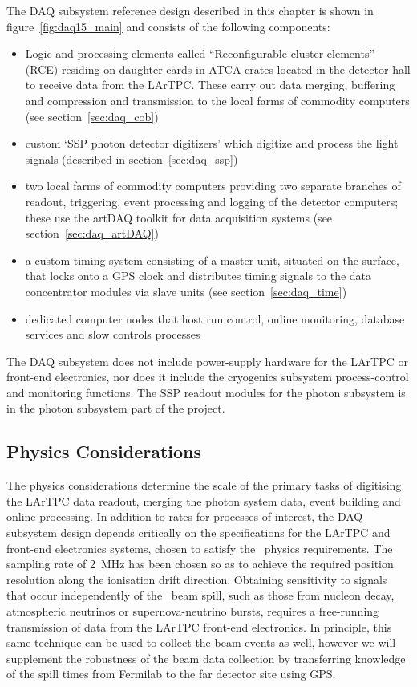 The DAQ subsystem reference design described in this chapter is shown
in figure~\ref{fig:daq15_main} and consists of the following
components:
\begin{itemize}
  \item Logic and processing elements called ``Reconfigurable cluster
    elements'' (RCE) residing on daughter cards in ATCA crates located
    in the detector hall to receive data from the LArTPC.  These carry
    out data merging, buffering and compression and transmission to the
    local farms of commodity computers (see section~\ref{sec:daq_cob})
  \item custom `SSP photon detector digitizers' which digitize and
    process the light signals (described in section~\ref{sec:daq_ssp}) 
  \item two local farms of commodity computers providing two separate
    branches of readout, triggering, event processing and logging of the
    detector computers; these use the artDAQ toolkit for data
    acquisition systems (see section~\ref{sec:daq_artDAQ})
  \item a custom timing system consisting of a master unit, situated
    on the surface, that locks onto a GPS clock and distributes timing
    signals to the data concentrator modules via slave units (see
    section~\ref{sec:daq_time})
  \item dedicated computer nodes that host run control, online
    monitoring, database services and slow controls processes
\end{itemize}
%
The DAQ subsystem does not include power-supply hardware for the
LArTPC or front-end electronics, nor does it include the cryogenics
subsystem process-control and monitoring functions.  The SSP readout
modules for the photon subsystem is in the photon subsystem part of
the project.

\subsection{Physics Considerations}
\label{sec:daq_phys}

The physics considerations determine the scale of the primary tasks of
digitising the LArTPC data readout, merging the photon system data,
event building and online processing.  In addition to rates for
processes of interest, the DAQ subsystem design depends critically on
the specifications for the LArTPC and front-end electronics systems,
chosen to satisfy the \LBNE\ physics requirements.  The sampling rate
of 2~MHz has been chosen so as to achieve the required position
resolution along the ionisation drift direction. Obtaining sensitivity
to signals that occur independently of the \LBNE\ beam spill, such as
those from nucleon decay, atmospheric neutrinos or supernova-neutrino
bursts, requires a free-running transmission of data from the LArTPC
front-end electronics.  In principle, this same technique can be used
to collect the beam events as well, however we will supplement the
robustness of the beam data collection by transferring knowledge of
the spill times from Fermilab to the far detector site using GPS.

